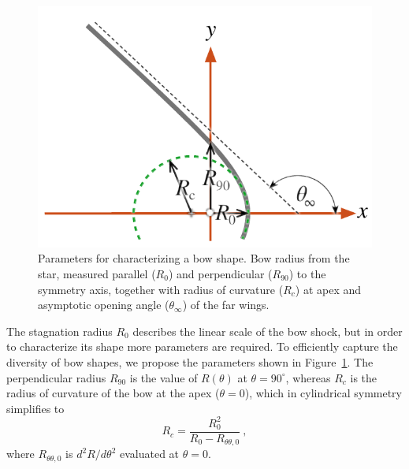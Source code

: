\begin{figure}
  \centering
  \includegraphics[width=\linewidth]{figs/characteristic-radii}
  \caption{Parameters for characterizing a bow shape.  Bow radius from
    the star, measured parallel (\(R_0\)) and perpendicular
    (\(R_{90}\)) to the symmetry axis, together with radius of
    curvature (\(R_c\)) at apex and asymptotic opening angle
    (\(\theta_\infty\)) of the far wings. }
  \label{fig:characteristic-radii}
\end{figure}

The stagnation radius \(R_0\) describes the linear scale of the bow
shock, but in order to characterize its shape more parameters are
required.  To efficiently capture the diversity of bow shapes, we
propose the parameters shown in Figure~\ref{fig:characteristic-radii}.
The perpendicular radius \(R_{90}\) is the value of \(R(\theta)\) at
\(\theta = 90^\circ\), whereas \(R_c\) is the radius of curvature of the bow at
the apex (\(\theta = 0\)), which in cylindrical symmetry simplifies to
\begin{equation}
  \label{eq:radius-curvature}
  R_c 
  = \frac{R_0^2}{R_0 - R_{\theta\theta,0}} \ , 
\end{equation}
where \(R_{\theta\theta,0}\) is \(d^2 \!R / d\theta^2\) evaluated at \(\theta = 0\).

